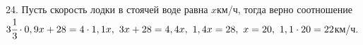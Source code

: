 24. Пусть скорость лодки в стоячей воде равна $x$км/ч, тогда верно соотношение $3\cfrac{1}{3}\cdot0,9x+28=4\cdot1,1x,\
3x+28=4,4x,\ 1,4x=28,\ x=20,\ 1,1\cdot20=22$км/ч.\\
